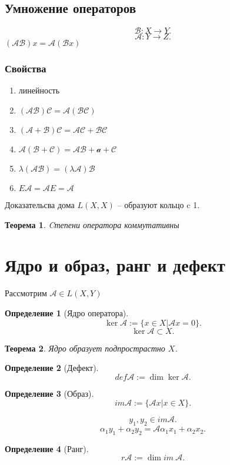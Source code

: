 \documentclass{scrartcl}
\newtheorem{theorem}{Теорема}
\newtheorem{definition}{Определение}
\begin{document}
\subsection{Умножение операторов}
\[
    \mathcal{B} : X \to Y
.\] 
\[
    \mathcal{A} : Y \to Z
.\] 
$( \mathcal{A} \mathcal{B} )x = \mathcal{A} (\mathcal{B}x)$
\subsubsection{Свойства}
\begin{enumerate}
    \item линейность
    \item $(\mathcal{A} \mathcal{B}) \mathcal{C} = \mathcal{A} (\mathcal{B} \mathcal{C})$
    \item $(\mathcal{A} + \mathcal{B}) \mathcal{C} = \mathcal{A} \mathcal{C} + \mathcal{B} \mathcal{C}$
    \item  $\mathcal{A} (\mathcal{B} + \mathcal{C}) = \mathcal{A} \mathcal{B} + \mathcal{a} + \mathcal{C}$
    \item  $\lambda(\mathcal{A} \mathcal{B}) = (\lambda \mathcal{A}) \mathcal{B}$
    \item  $E \mathcal{A} =\mathcal{A} E = \mathcal{A}$
\end{enumerate}
Доказательсва дома
$L(X,X)$ -- образуют кольцо c 1.
\begin{theorem}
    Cтепени оператора коммутативны
\end{theorem}
\section{Ядро и образ, ранг и дефект}
Рассмотрим $\mathcal{A} \in L(X,Y)$
\begin{definition}[Ядро оператора]
    \[
        \ker{\mathcal{A}} := \{x \in X | \mathcal{A} x = 0\}
    .\] 
    \[
        \ker{\mathcal{A}} \subset X
    .\] 
\end{definition}
\begin{theorem}
    Ядро образует подпрострастно $X$.
\end{theorem}
\begin{definition}[Дефект]
    \[
        def \mathcal{A} := \dim{\ker{\mathcal{A}}}
    .\] 
\end{definition}
\begin{definition}[Образ]
    \[
        im{\mathcal{A}} := \{\mathcal{A} x | x \in X\}
    .\] 
\end{definition}
\[
    y_1,y_2 \in im{\mathcal{A}}
.\] 
\[
\alpha_1 y_1 + \alpha_2 y_2 = \mathcal{ A }\alpha_1 x_1 + \alpha_2 x_2
.\] 
\begin{definition}[Ранг]
    \[
        r{\mathcal{A}} := \dim{im~ \mathcal{A}}
    .\] 
\end{definition}
\end{document}
